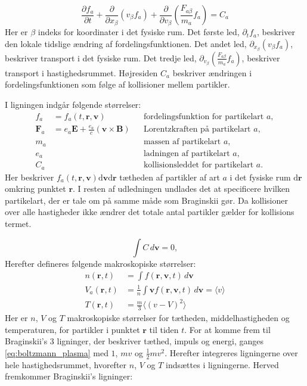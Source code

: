 \begin{equation}
    \frac{\partial f_a}{\partial t} + \frac{\partial}{\partial x_\beta} \left(v_\beta f_a\right) +
    \frac{\partial}{\partial v_\beta} \left(\frac{F_{a\beta}}{m_a} f_a\right) = C_a
    \label{eq:boltzmann_plasma}
\end{equation}
Her er $\beta$ indeks for koordinater i det fysiske rum. Det første led, $\partial_t f_a$, beskriver den lokale tidslige ændring af fordelingsfunktionen.
Det andet led, $\partial_{x_\beta}(v_\beta f_a)$, beskriver transport i det fysiske rum.
Det tredje led, $\partial_{v_\beta}\left( \frac{F_{a\beta}}{m_a} f_a \right)$, beskriver transport i hastighedsrummet.
Højresiden $C_a$ beskriver ændringen i fordelingsfunktionen som følge af kollisioner mellem partikler.


I ligningen indgår følgende størrelser:
\begin{align*}
    f_a &= f_a(t,\mathbf{r},\mathbf{v}) &&\text{fordelingsfunktion for partikelart $a$}, \\
    \mathbf{F}_a &= e_a\mathbf{E} + \frac{e_a}{c}\left(\mathbf{v}\times\mathbf{B}\right) &&\text{Lorentzkraften på partikelart $a$}, \\
    m_a &&&\text{massen af partikelart $a$}, \\
    e_a &&&\text{ladningen af partikelart $a$}, \\
    C_a &&&\text{kollisionsleddet for partikelart $a$}.
\end{align*}
Her beskriver $f_a(t,\mathbf{r},\mathbf{v})\mathrm{d}\mathbf{v}\mathrm{d}\mathbf{r}$ tætheden af partikler af art $a$ i det fysiske rum $\mathrm{d}\mathbf{r}$ omkring punktet $\mathbf{r}$.
I resten af udledningen undlades det at specificere hvilken partikelart, der er tale om på samme måde som Braginskii gør. 
Da kollisioner over alle hastigheder ikke ændrer det totale antal partikler gælder for kollisions termet.

\begin{equation*}
    \int C\,d\mathbf{v} = 0, 
\end{equation*}
Herefter defineres følgende makroskopiske størrelser:
\begin{align*}
    n(\mathbf{r},t) &= \int f(\mathbf{r},\mathbf{v},t)\,d\mathbf{v}\\
    V_{a}(\mathbf{r},t) &= \frac{1}{n} \int \mathbf{v} f(\mathbf{r},\mathbf{v},t)\,d\mathbf{v} = \langle v \rangle\\
    T(\mathbf{r},t) &= \frac{m}{3}\langle (v - V)^2 \rangle
\end{align*}
Her er $n$, $V$ og $T$ makroskopiske størrelser for tætheden, middelhastigheden og temperaturen, for partikler i punktet $\mathbf{r}$ til tiden $t$.
For at komme frem til Braginskii's 3 ligninger, der beskriver tæthed, impuls og energi, ganges \eqref{eq:boltzmann_plasma} med $1$, $m v$ og $\frac{1}{2} m v^2$.
Herefter integreres ligningerne over hele hastighedsrummet, hvorefter $n$, $V$ og $T$ indsættes i ligningerne. Herved fremkommer Braginskii's ligninger:

